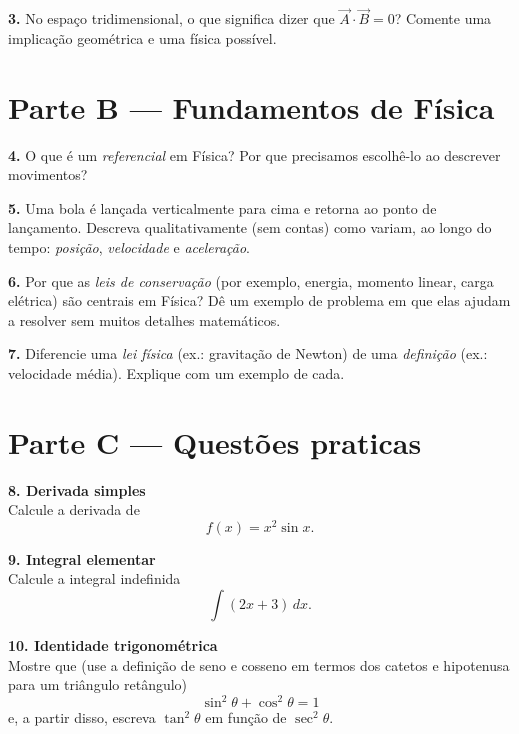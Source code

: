 \answerlines{3.2cm}

\textbf{3.} No espaço tridimensional, o que significa dizer que $\vec{A}\cdot\vec{B}=0$?
Comente uma implicação geométrica e uma física possível.

\answerlines{3.2cm}

\section*{Parte B — Fundamentos de Física}

\textbf{4.} O que é um \textit{referencial} em Física? Por que precisamos escolhê-lo ao
descrever movimentos?

\answerlines{3.2cm}

\textbf{5.} Uma bola é lançada verticalmente para cima e retorna ao ponto de lançamento.
Descreva qualitativamente (sem contas) como variam, ao longo do tempo: \textit{posição},
\textit{velocidade} e \textit{aceleração}.

\answerlines{4.2cm}

\textbf{6.} Por que as \textit{leis de conservação} (por exemplo, energia, momento
linear, carga elétrica) são centrais em Física? Dê um exemplo de problema em que elas
ajudam a resolver sem muitos detalhes matemáticos.

\answerlines{3.6cm}

\textbf{7.} Diferencie uma \textit{lei física} (ex.: gravitação de Newton) de uma
\textit{definição} (ex.: velocidade média). Explique com um exemplo de cada.

\pagebreak

\section*{Parte C — Questões praticas}

\textbf{8. Derivada simples} \\
Calcule a derivada de
\[
  f(x) = x^2 \sin x.
\]

\vspace{3cm}

\textbf{9. Integral elementar} \\
Calcule a integral indefinida
\[
  \int (2x + 3)\, dx.
\]

\vspace{3cm}

\textbf{10. Identidade trigonométrica} \\
Mostre que (use a definição de seno e cosseno em termos dos catetos e hipotenusa para um
triângulo retângulo)
\[
  \sin^2\theta + \cos^2\theta = 1
\]
e, a partir disso, escreva $\tan^2\theta$ em função de $\sec^2\theta$.

